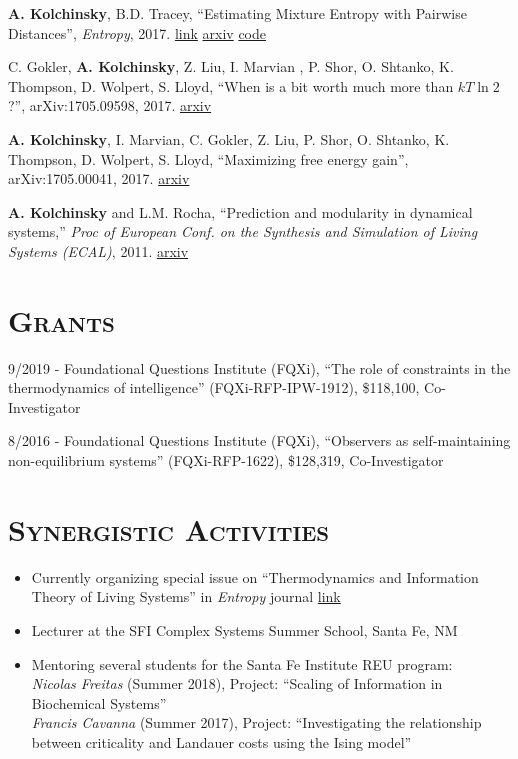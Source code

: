 \documentclass[margin,line,centered,12pt]{res}
\begin{document}
\begin{resume}
\textbf{A. Kolchinsky}, B.D. Tracey, ``Estimating Mixture Entropy with Pairwise Distances'', \emph{Entropy}, 2017.
\href{http://www.mdpi.com/1099-4300/19/7/361}{link}
\href{https://arxiv.org/abs/1706.02419}{arxiv}
\href{https://github.com/btracey/mixent/}{code}

C. Gokler, \textbf{A. Kolchinsky}, Z. Liu, I. Marvian , P. Shor, O. Shtanko, K. Thompson, D. Wolpert, S. Lloyd, ``When is a bit worth much more than $kT \ln 2$?'', arXiv:1705.09598, 2017. \href{https://arxiv.org/abs/1705.09598}{arxiv}

\textbf{A. Kolchinsky}, I. Marvian, C. Gokler, Z. Liu, P. Shor, O. Shtanko, K. Thompson, D. Wolpert, S. Lloyd, ``Maximizing free energy gain'', arXiv:1705.00041, 2017. \href{https://arxiv.org/abs/1705.00041}{arxiv}


\textbf{A. Kolchinsky} and L.M. Rocha, ``Prediction and modularity in dynamical systems,'' \emph{Proc
of European Conf. on the Synthesis and Simulation of Living Systems (ECAL)}, 2011. 
\href{http://arxiv.org/abs/1106.3703}{arxiv}


\section{\textsc{Grants}}
9/2019 - Foundational Questions Institute (FQXi), 
``The role of constraints in the thermodynamics of intelligence'' (FQXi-RFP-IPW-1912),
\$118,100, Co-Investigator

8/2016 - Foundational Questions Institute (FQXi), 
``Observers as self-maintaining non-equilibrium systems'' (FQXi-RFP-1622),
\$128,319, Co-Investigator


\section{\textsc{Synergistic Activities}}

\begin{itemize}[leftmargin=*]
\item Currently organizing special issue on ``Thermodynamics and Information Theory of Living Systems'' in \emph{Entropy} journal \href{https://www.mdpi.com/journal/entropy/special_issues/thermodynamics_living_systems}{link} 

\item Lecturer at the SFI Complex Systems Summer School, Santa Fe, NM

\item Mentoring several students for the Santa Fe Institute REU program: \\
\emph{Nicolas Freitas} (Summer 2018), Project: ``Scaling of Information in Biochemical Systems''\\
\emph{Francis Cavanna} (Summer 2017), Project: ``Investigating the relationship between criticality and Landauer costs using the Ising model''


\end{itemize}
\end{resume}
\end{document}
